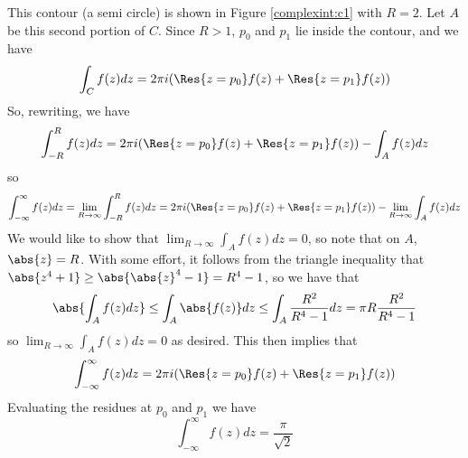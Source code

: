 This contour (a semi circle) is shown in Figure \ref{complexint:c1} with $R = 2$.
Let $A$ be this second portion of $C$.
Since $R>1$, $p_0$ and $p_1$ lie inside the contour, and we have
\[\int_C f(z)dz = 2\pi i (\Res{z=p_0} f(z) +\Res{z=p_1} f(z))\]
So, rewriting, we have
\[\int_{-R}^R f(z) dz = 2\pi i (\Res{z=p_0} f(z) +\Res{z=p_1} f(z)) - \int_A f(z) dz\]
so
\[\int_{-\infty}^{\infty} f(z) dz = \lim_{R\to \infty} \int_{-R}^R f(z) dz = 2\pi i (\Res{z=p_0} f(z) +\Res{z=p_1} f(z)) - \lim_{R\to \infty} \int_A f(z) dz\]
We would like to show that $\lim_{R\to\infty} \int_A f(z) dz = 0$, so note that on $A$, $\abs{z}=R$.
With some effort, it follows from the triangle inequality that $\abs{z^4+1}\geq \abs{\abs{z}^4-1} = R^4 -1$, so we have that
\[\abs{\int_A f(z) dz}\leq \int_A \abs{f(z)} dz \leq \int_A \frac{R^2}{R^4 -1}dz = \pi R \frac{R^2}{R^4-1}\]
so $\lim_{R\to\infty} \int_A f(z) dz = 0$ as desired.
This then implies that
\[\int_{-\infty}^{\infty} f(z) dz = 2\pi i (\Res{z=p_0} f(z) +\Res{z=p_1} f(z))\]
Evaluating the residues at $p_0$ and $p_1$ we have
\[\int_{-\infty}^{\infty} f(z) dz = \frac{\pi}{\sqrt{2}}\]


